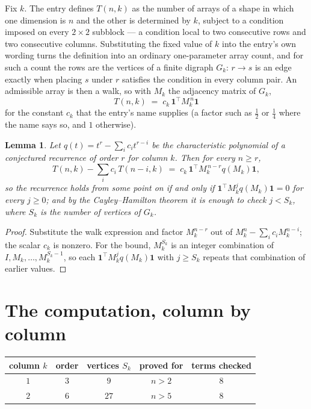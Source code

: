 \documentclass[11pt,a4paper]{article}
\theoremstyle{plain}
\newtheorem{lemma}[theorem]{Lemma}
\theoremstyle{definition}
\begin{document}
Fix $k$. The entry defines $T(n,k)$ as the number of arrays of a shape in which one dimension
is $n$ and the other is determined by $k$, subject to a condition imposed on every
$2\times2$ subblock --- a condition local to two consecutive rows and two consecutive columns.
Substituting the fixed value of $k$ into the entry's own wording turns the definition into an
ordinary one-parameter array count, and for such a count the rows are the vertices of a finite
digraph $G_k$: $r\to s$ is an edge exactly when placing $s$ under $r$ satisfies the condition
in every column pair. An admissible array is then a walk, so with $M_k$ the adjacency matrix
of $G_k$,
\[
T(n,k)\;=\;c_k\,\mathbf{1}^{\!\top}M_k^{\,n}\mathbf{1}
\]
for the constant $c_k$ that the entry's name supplies (a factor such as $\tfrac12$ or
$\tfrac14$ where the name says so, and $1$ otherwise).

\begin{lemma}\label{lem:crit}
Let $q(t)=t^{r}-\sum_i c_it^{r-i}$ be the characteristic polynomial of a conjectured
recurrence of order $r$ for column $k$. Then for every $n\ge r$,
\[
T(n,k)-\sum_i c_i\,T(n-i,k)\;=\;c_k\,\mathbf{1}^{\!\top}M_k^{\,n-r}q(M_k)\mathbf{1},
\]
so the recurrence holds from some point on if and only if
$\mathbf{1}^{\!\top}M_k^{j}q(M_k)\mathbf{1}=0$ for every $j\ge0$; and by the
Cayley--Hamilton theorem it is enough to check $j<S_k$, where $S_k$ is the number of vertices
of $G_k$.
\end{lemma}

\begin{proof}
Substitute the walk expression and factor $M_k^{n-r}$ out of $M_k^{n}-\sum_ic_iM_k^{n-i}$;
the scalar $c_k$ is nonzero. For the bound, $M_k^{S_k}$ is an integer combination of
$I,M_k,\dots,M_k^{S_k-1}$, so each $\mathbf{1}^{\!\top}M_k^{j}q(M_k)\mathbf{1}$ with
$j\ge S_k$ repeats that combination of earlier values.
\end{proof}

\section{The computation, column by column}

\begin{center}
\begin{tabular}{ccccc}
column $k$ & order & vertices $S_k$ & proved for & terms checked \\ \hline
$1$ & $3$ & $9$ & $n>2$ & $8$ \\
$2$ & $6$ & $27$ & $n>5$ & $8$ \\
\end{tabular}
\end{center}
\end{document}

